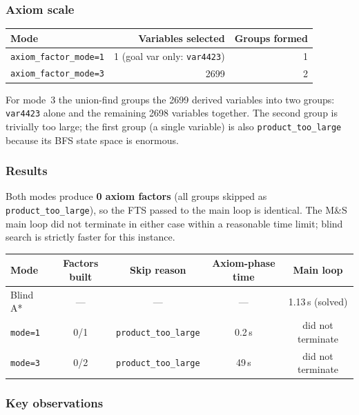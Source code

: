 \documentclass[11pt,a4paper]{article}
\begin{document}
\subsubsection*{Axiom scale}

\begin{center}
\begin{tabular}{lrr}
\toprule
\textbf{Mode} & \textbf{Variables selected} & \textbf{Groups formed} \\
\midrule
\texttt{axiom\_factor\_mode=1} & 1 (goal var only: \texttt{var4423}) & 1 \\
\texttt{axiom\_factor\_mode=3} & 2699 & 2 \\
\bottomrule
\end{tabular}
\end{center}

For mode~3 the union-find groups the 2699 derived variables into two groups:
\texttt{var4423} alone and the remaining 2698 variables together.  The second
group is trivially too large; the first group (a single variable) is also
\texttt{product\_too\_large} because its BFS state space is enormous.

\subsubsection*{Results}

Both modes produce \textbf{0 axiom factors} (all groups skipped as
\texttt{product\_too\_large}), so the FTS passed to the main loop is
identical.  The M\&S main loop did not terminate in either case within a
reasonable time limit; blind search is strictly faster for this instance.

\begin{center}
\begin{tabular}{lcccc}
\toprule
\textbf{Mode} & \textbf{Factors built} & \textbf{Skip reason} &
  \textbf{Axiom-phase time} & \textbf{Main loop} \\
\midrule
Blind A*          & ---  & ---                 & ---    & 1.13\,s (solved) \\
\texttt{mode=1}   & 0/1  & \texttt{product\_too\_large} & 0.2\,s & did not terminate \\
\texttt{mode=3}   & 0/2  & \texttt{product\_too\_large} & 49\,s  & did not terminate \\
\bottomrule
\end{tabular}
\end{center}

\subsubsection*{Key observations}
\end{document}
